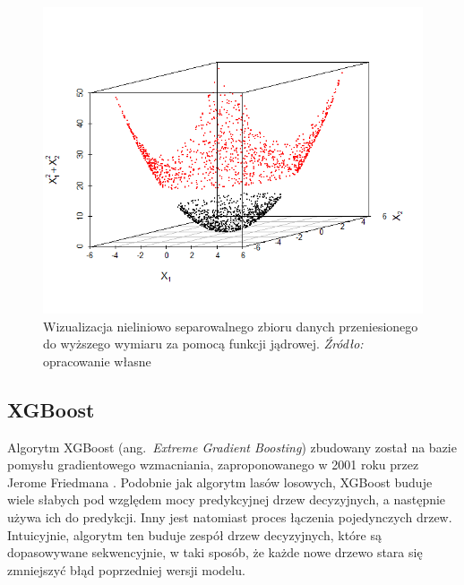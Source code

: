 \documentclass[12pt,a4paper,twoside,openany]{book}
\begin{document}
\begin{figure}
\centering
\includegraphics[scale=0.82]{./rys004b}
\caption{Wizualizacja nieliniowo separowalnego zbioru danych przeniesionego do wyższego wymiaru za pomocą funkcji jądrowej. \textit{Źródło:} opracowanie własne}\label{rys004b}
\end{figure}



\subsection{XGBoost}

Algorytm XGBoost (ang.~\textit{Extreme Gradient Boosting}) zbudowany został na bazie pomysłu gradientowego wzmacniania, zaproponowanego w 2001 roku przez Jerome Friedmana \citep{friedman2001}. Podobnie jak algorytm lasów losowych, XGBoost buduje wiele słabych pod względem mocy predykcyjnej drzew decyzyjnych, a następnie używa ich do predykcji. Inny jest natomiast proces łączenia pojedynczych drzew. Intuicyjnie, algorytm ten buduje zespół drzew decyzyjnych, które są dopasowywane sekwencyjnie, w taki sposób, że każde nowe drzewo stara się zmniejszyć błąd poprzedniej wersji modelu.
\end{document}

